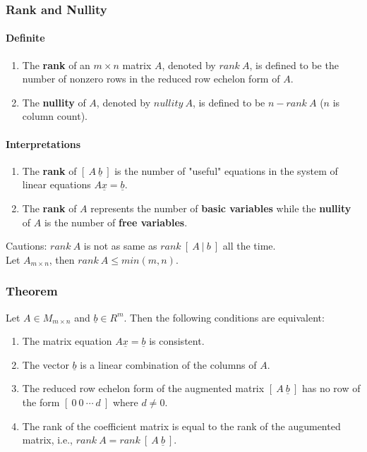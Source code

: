 \documentclass[14pt]{article}
\begin{document}
\begin{CJK}{UTF8}{min}
\subsubsection{Rank and Nullity}
\paragraph{Definite}
\begin{enumerate}
\item The \textbf{rank} of an $m \times n$ matrix $A$, denoted by $rank\ A$, is defined to be the number of nonzero rows in the reduced row echelon form of $A$.
\item The \textbf{nullity} of $A$, denoted by $nullity\ A$, is defined to be $n - rank\ A$ ($n$ is column count).
\end{enumerate}
\paragraph{Interpretations}
\begin{enumerate}
\item The \textbf{rank} of $[\ A\ \underline{b}\ ]$ is the number of "useful" equations in the system of linear equations $A\underline{x}=\underline{b}$.
\item The \textbf{rank} of $A$ represents the number of \textbf{basic variables} while the \textbf{nullity} of $A$ is the number of \textbf{free variables}.
\end{enumerate}
Cautions: $rank\ A$ is not as same as $rank\ [\ A\ |\ b\ ]$ all the time.\\
Let $A_{m \times n}$, then $rank\ A \leq min(m, n)$.
\subsubsection{Theorem}
Let $A \in M_{m \times n}$ and $\underline{b} \in R^m$. Then the following conditions are equivalent:
\begin{enumerate}
\item The matrix equation $A\underline{x}=\underline{b}$ is consistent.
\item The vector $\underline{b}$ is a linear combination of the columns of $A$.
\item The reduced row echelon form of the augmented matrix $[\ A\ \underline{b}\ ]$ has no row of the form $[\ 0\ 0\ \cdots \ d\ ]$ where $d \neq 0$.
\item The rank of the coefficient matrix is equal to the rank of the augumented matrix, i.e., $rank\ A = rank\ [\ A\ \underline{b}\ ]$.
\end{enumerate}


\end{CJK}
\end{document}
